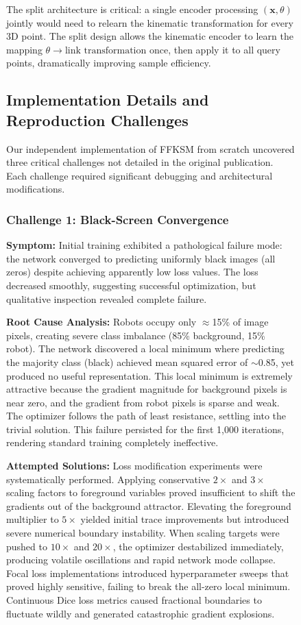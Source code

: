\documentclass[12pt,a4paper,oneside]{report}
\begin{document}
\begin{figure}[H]
The split architecture is critical: a single encoder processing $(\mathbf{x}, \theta)$ jointly would need to relearn the kinematic transformation for every 3D point. The split design allows the kinematic encoder to learn the mapping $\theta \rightarrow \text{link transformation}$ once, then apply it to all query points, dramatically improving sample efficiency.

\subsection{Implementation Details and Reproduction Challenges}

Our independent implementation of FFKSM from scratch uncovered three critical challenges not detailed in the original publication. Each challenge required significant debugging and architectural modifications.

\subsubsection{Challenge 1: Black-Screen Convergence}

\textbf{Symptom:} Initial training exhibited a pathological failure mode: the network converged to predicting uniformly black images (all zeros) despite achieving apparently low loss values. The loss decreased smoothly, suggesting successful optimization, but qualitative inspection revealed complete failure.

\textbf{Root Cause Analysis:} Robots occupy only $\approx$15\% of image pixels, creating severe class imbalance (85\% background, 15\% robot). The network discovered a local minimum where predicting the majority class (black) achieved mean squared error of $\sim$0.85, yet produced no useful representation. This local minimum is extremely attractive because the gradient magnitude for background pixels is near zero, and the gradient from robot pixels is sparse and weak. The optimizer follows the path of least resistance, settling into the trivial solution. This failure persisted for the first 1,000 iterations, rendering standard training completely ineffective.

\textbf{Attempted Solutions:} Loss modification experiments were systematically performed. Applying conservative $2\times$ and $3\times$ scaling factors to foreground variables proved insufficient to shift the gradients out of the background attractor. Elevating the foreground multiplier to $5\times$ yielded initial trace improvements but introduced severe numerical boundary instability. When scaling targets were pushed to $10\times$ and $20\times$, the optimizer destabilized immediately, producing volatile oscillations and rapid network mode collapse. Focal loss implementations introduced hyperparameter sweeps that proved highly sensitive, failing to break the all-zero local minimum. Continuous Dice loss metrics caused fractional boundaries to fluctuate wildly and generated catastrophic gradient explosions.


\end{figure}
\end{document}
